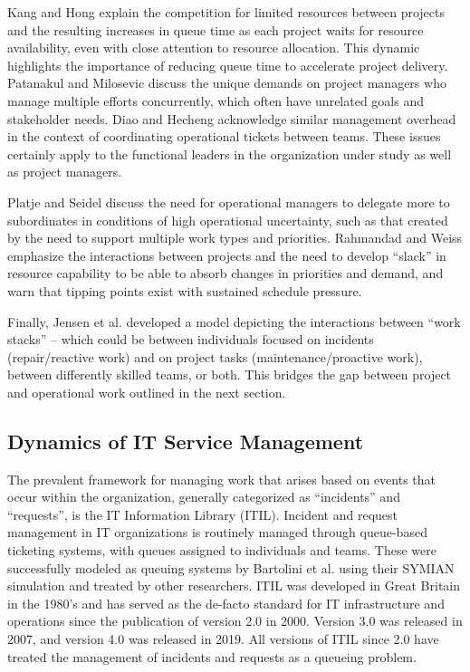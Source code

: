 \documentclass[conference]{IEEEtran}
\begin{document}
Kang and Hong\cite{kang_evaluation_2009} explain the competition for limited resources between projects and the resulting increases in queue time as each project waits for resource availability, even with close attention to resource allocation.  This dynamic highlights the importance of reducing queue time to accelerate project delivery. Patanakul and Milosevic\cite{patanakul_competency_2008} discuss the unique demands on project managers who manage multiple efforts concurrently, which often have unrelated goals and stakeholder needs. Diao and Hecheng\cite{diao_modeling_2011} acknowledge similar management overhead in the context of coordinating operational tickets between teams. These issues certainly apply to the functional leaders in the organization under study as well as project managers.

Platje and Seidel\cite{platje_breakthrough_1993} discuss the need for operational managers to delegate more to subordinates in conditions of high operational uncertainty, such as that created by the need to support multiple work types and priorities. Rahmandad and Weiss\cite{rahmandad_dynamics_2009} emphasize the interactions between projects and the need to develop ``slack'' in resource capability to be able to absorb changes in priorities and demand, and warn that tipping points exist with sustained schedule pressure.

Finally, Jensen et al.\cite{jensen_dynamic_2006} developed a model depicting the interactions between ``work stacks'' -- which could be between individuals focused on incidents (repair/reactive work) and on project tasks (maintenance/proactive work), between differently skilled teams, or both. This bridges the gap between project and operational work outlined in the next section.

\subsection{Dynamics of IT Service Management}

The prevalent framework for managing work that arises based on events that occur within the organization, generally categorized as ``incidents'' and ``requests'', is the IT Information Library (ITIL). Incident and request management in IT organizations is routinely managed through queue-based ticketing systems, with queues assigned to individuals and teams. These were successfully modeled as queuing systems by Bartolini et al. using their SYMIAN simulation \cite{bartolini_symian_2010} and treated by other researchers\cite{antoniol_queue_2001}. ITIL was developed in Great Britain in the 1980's and has served as the de-facto standard for IT infrastructure and operations since the publication of version 2.0 in 2000. Version 3.0 was released in 2007, and version 4.0 was released in 2019. All versions of ITIL since 2.0 have treated the management of incidents and requests as a queueing problem. 
\end{document}
